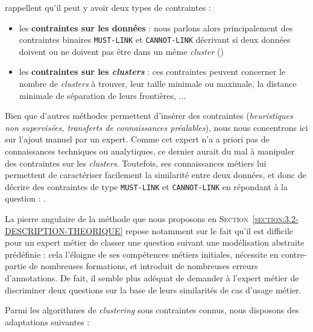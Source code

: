 		\cite{lampert-etal:2018:constrained-distance-based} rappellent qu'il peut y avoir deux types de contraintes :
		\begin{itemize}
			\item les \textbf{contraintes sur les données} : nous parlons alors principalement des contraintes binaires \texttt{MUST-LINK} et \texttt{CANNOT-LINK} décrivant si deux données doivent ou ne doivent pas être dans un même \textit{cluster} (\cite{wagstaff-cardie:2000:clustering-instancelevel-constraints})
			\item les \textbf{contraintes sur les \textit{clusters}} : ces contraintes peuvent concerner le nombre de \textit{clusters} à trouver, leur taille minimale ou maximale, la distance minimale de séparation de leurs frontières, ...
		\end{itemize}
		
		Bien que d'autres méthodes permettent d'insérer des contraintes (\textit{heuristiques non supervisées, transferts de connaissances préalables}), nous nous concentrons ici sur l'ajout manuel par un expert.
		Comme cet expert n'a a priori pas de connaissances techniques ou analytiques, ce dernier aurait du mal à manipuler des contraintes sur les \textit{clusters}.
		Toutefois, ses connaissances métiers lui permettent de caractériser facilement la similarité entre deux données, et donc de décrire des contraintes de type \texttt{MUST-LINK} et \texttt{CANNOT-LINK} en répondant à la question : .
		
		\begin{leftBarAuthorOpinion}
			La pierre angulaire de la méthode que nous proposons en \textsc{Section~\ref{section:3.2-DESCRIPTION-THEORIQUE}} repose notamment sur le fait qu'il est difficile pour un expert métier de classer une question suivant une modélisation abstraite prédéfinie : cela l'éloigne de ses compétences métiers initiales, nécessite en contre-partie de nombreuses formations, et introduit de nombreuses erreurs d'annotations.
			De fait, il semble plus adéquat de demander à l'expert métier de discriminer deux questions sur la base de leurs similarités de cas d'usage métier.
		\end{leftBarAuthorOpinion}
		
		
		Parmi les algorithmes de \textit{clustering} sous contraintes connus, nous disposons des adaptations suivantes :
		
